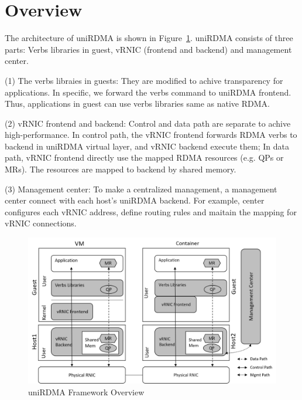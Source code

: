 \section{Overview}
The architecture of uniRDMA is shown in Figure~\ref{fig:framework-overview}. uniRDMA consists of three parts: Verbs libraries in guest, vRNIC (frontend and backend) and management center.

(1) The verbs libraies in guests: They are modified to achive transparency for applications. In specific, we forward the verbs command to uniRDMA frontend. Thus, applications in guest can use verbs libraries same as native RDMA.

(2) vRNIC frontend and backend: Control and data path are separate to achive high-performance. In control path, the vRNIC frontend forwards RDMA verbs to backend in uniRDMA virtual layer, and vRNIC backend execute them; In data path, vRNIC frontend directly use the mapped RDMA resources (e.g. QPs or MRs). The resources are mapped to backend by shared memory.

(3) Management center: To make a centralized management, a management center connect with each host's uniRDMA backend. For example, center configures each vRNIC address, define routing rules and maitain the mapping for vRNIC connections.

\begin{figure}[!ht]
	\centering
	\includegraphics[width=1\linewidth]{images/framework-overview.png}
	\caption{uniRDMA Framework Overview}
	\label{fig:framework-overview}
\end{figure}